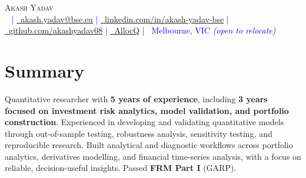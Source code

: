 

\begin{center}
    {\Huge \scshape Akash Yadav} \\[3pt]
    \footnotesize
    \textcolor{blue}{
        \raisebox{-0.1\height}\faPhone\ \underline{\href{tel:\phonenum}{\phonenum}} | 
        \href{mailto:akash.yadav@bse.eu}{\raisebox{-0.2\height}\faEnvelope\  \underline{akash.yadav@bse.eu}} | 
        \href{https://www.linkedin.com/in/akash-yadav-bse}{\raisebox{-0.2\height}\faLinkedin\ \underline{linkedin.com/in/akash-yadav-bse}} |
        \href{https://github.com/akashyadav08}
        {\raisebox{-0.2\height}\faGithub\ \underline{github.com/akashyadav08}} |
        \href{https://www.allocq.com/}
        {\raisebox{-0.1\height}\faAllocQ\ \underline{AllocQ}} | 
        {\raisebox{-0.1\height}\faMapMarker\ Melbourne, VIC} \textit{(open to relocate)}
    }
\end{center}

\section*{Summary}
\noindent
\small
\justifying %
Quantitative researcher with \textbf{5 years of experience}, including \textbf{3 years focused on investment risk analytics, model validation, and portfolio construction}. Experienced in developing and validating quantitative models through out-of-sample testing, robustness analysis, sensitivity testing, and reproducible research. Built analytical and diagnostic workflows across portfolio analytics, derivatives modelling, and financial time-series analysis, with a focus on reliable, decision-useful insights. Passed \textbf{FRM Part I} (GARP).

